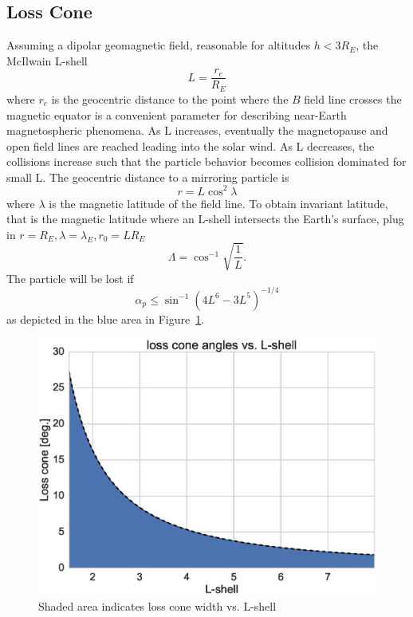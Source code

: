 \FloatBarrier
\subsection{Loss Cone}\label{sec:losscone}

Assuming a dipolar geomagnetic field, reasonable for altitudes $h < 3 R_E$, the McIlwain L-shell
\begin{equation}\label{eq:Lshell}
L = \frac{r_e}{R_E}
\end{equation}
where $r_e$ is the geocentric distance to the point where the $B$ field line crosses the magnetic equator is a convenient parameter for describing near-Earth magnetospheric phenomena.
As L increases, eventually the magnetopause and open field lines are reached leading into the solar wind.
As L decreases, the collisions increase such that the particle behavior becomes collision dominated for small L.
The geocentric distance to a mirroring particle is
\begin{equation}
r=L \cos^2 \lambda
\end{equation}
where $\lambda$ is the magnetic latitude of the field line.
To obtain invariant latitude, that is the magnetic latitude where an L-shell intersects the Earth's surface, plug in $r=R_E, \lambda=\lambda_E, r_0=L R_E$ \citep{kivelson}
\begin{equation}
\Lambda = \cos^{-1} \sqrt{\frac{1}{L}}.
\end{equation}
The particle will be lost if 
\begin{equation}
\alpha_p \leq \sin^{-1}\left(4L^6 - 3 L^5\right)^{-1/4}
\end{equation}
as depicted in the blue area in Figure~\ref{fig:losscone}.
\begin{figure}\centering
	\includegraphics[width=0.8\linewidth]{gfx/lossconeangle}
	\caption{Shaded area indicates loss cone width vs. L-shell}\label{fig:losscone}
\end{figure}
